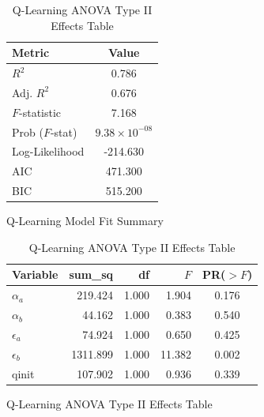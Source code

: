 \documentclass{article}
\begin{document}
\begin{table}[htbp]
    \centering
    
    \begin{subfigure}[b]{0.4\textwidth}
        \centering
        \caption{Q-Learning Model Fit Summary}
        \label{tab:q_ols_summary}
        \begin{tabular}{lc}
            \toprule
            \textbf{Metric} & \textbf{Value} \\ 
            \midrule
            $R^2$ & 0.786 \\
            Adj. $R^2$ & 0.676 \\
            $F$-statistic & 7.168 \\
            Prob ($F$-stat) & $9.38 \times 10^{-08}$ \\
            Log-Likelihood & -214.630 \\
            AIC & 471.300 \\
            BIC & 515.200 \\ 
            \bottomrule
        \end{tabular}
    \end{subfigure}
    \hfill
    \begin{subfigure}[b]{0.58\textwidth}
        \centering
        \caption{Q-Learning ANOVA Type II Effects Table}
        \label{tab:q_anova_results}
        \begin{tabular}{lrrrc}
            \toprule
            \textbf{Variable} & \textbf{sum\_sq} & \textbf{df} & \textbf{$F$} & \textbf{PR($>F$)} \\ 
            \midrule
            $\alpha_a$ & 219.424 & 1.000 & 1.904 & 0.176 \\
            $\alpha_b$ & 44.162 & 1.000 & 0.383 & 0.540 \\
            $\epsilon_a$ & 74.924 & 1.000 & 0.650 & 0.425 \\
            $\epsilon_b$ & 1311.899 & 1.000 & 11.382 & 0.002 \\
            qinit & 107.902 & 1.000 & 0.936 & 0.339 \\ 
            \bottomrule
        \end{tabular}
    \end{subfigure}
    
    
    \vspace{5mm} %
    

\end{table}
\end{document}
